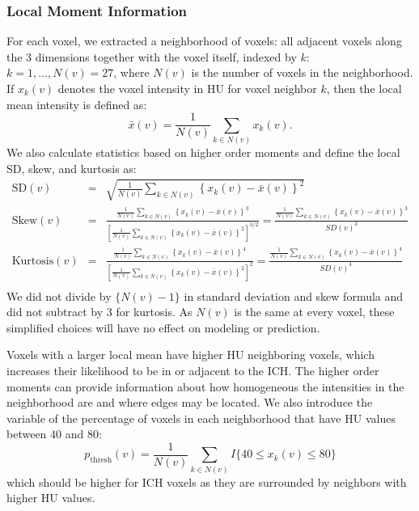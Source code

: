 \documentclass{elsarticle_nonatbib}\usepackage[]{graphicx}\usepackage[]{color}
\begin{document}
\subsubsection{Local Moment Information} For each voxel, we extracted a neighborhood of voxels: all adjacent voxels along the $3$ dimensions together with the voxel itself, indexed by $k$: $k = 1, \dots, N(v) = 27$, where $N(v)$ is the number of voxels in the neighborhood.  If $x_k(v)$ denotes the voxel intensity in HU for voxel neighbor $k$, then the local mean intensity is defined as:
\begin{equation}
\bar{x}(v) = \frac{1}{N(v)} \sum_{k \in N(v)} x_k(v). \label{eq:mean}
\end{equation}
We also calculate statistics based on higher order moments and define the local SD, skew, and kurtosis as:
\begin{eqnarray*}
\text{SD}(v) &=& \sqrt{ \frac{1}{N(v)} \sum_{k \in N(v)} \left\{x_k(v) - \bar{x}(v)\right\}^2 } \\
\text{Skew}(v) &=& \frac{ \frac{1}{N(v)} \sum\limits_{k \in N(v)} \left\{x_k(v)-\bar{x}(v) \right\}^3 } {\left[ \frac{1}{N(v)} \sum\limits_{k \in N(v)} \left\{x_k(v)- \bar{x}(v)\right\}^2\right]^{3/2}} = \frac{ \frac{1}{N(v)} \sum\limits_{k \in N(v)} \left\{x_k(v)-\bar{x}(v) \right\}^3 } {SD(v)^3} \\
\text{Kurtosis}(v) &=& \frac{ \frac{1}{N(v)} \sum\limits_{k \in N(v)} \left\{x_k(v)- \bar{x}(v)\right\}^4 }{ \left[ \frac{1}{N(v)} \sum\limits_{k \in N(v)} \left\{x_k(v)- \bar{x}(v)\right\}^2\right]^2} = \frac{ \frac{1}{N(v)} \sum\limits_{k \in N(v)} \left\{x_k(v)- \bar{x}(v)\right\}^4 }{ SD(v)^4 } \\
\label{eq:moment}
\end{eqnarray*}
We did not divide by $\{N(v) - 1\}$ in standard deviation and skew formula and did not subtract by $3$ for kurtosis.  As $N(v)$ is the same at every voxel, these simplified choices will have no effect on modeling or prediction.


Voxels with a larger local mean have higher HU neighboring voxels, which increases their likelihood to be in or adjacent to the ICH.  The higher order moments can provide information about how homogeneous the intensities in the neighborhood are and where edges may be located.  We also introduce the variable of the percentage of voxels in each neighborhood that have HU values between $40$ and $80$:
\begin{equation}
p_{\text{thresh}}(v) = \frac{1}{N(v)} \sum_{k \in N(v)} I\{ 40 \leq x_k(v) \leq 80 \} \label{eq:pct}
\end{equation}
which should be higher for ICH voxels as they are surrounded by neighbors with higher HU values.
\end{document}
